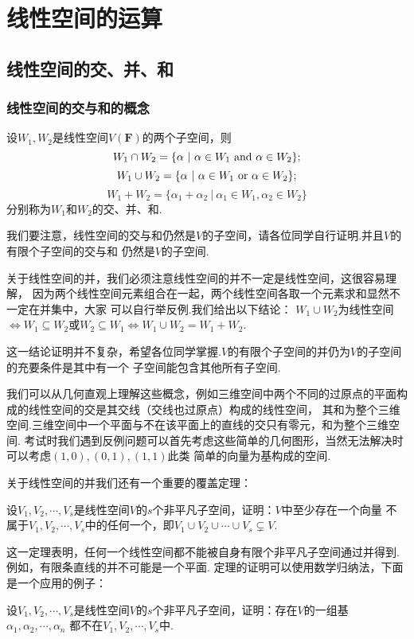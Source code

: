\chapter{线性空间的运算}

\section{线性空间的交、并、和}
\subsection{线性空间的交与和的概念}
\begin{definition}
	设$W_1,W_2$是线性空间$V(\mathbf{F})$的两个子空间，则
	$$W_1 \cap W_2=\{\alpha\ |\ \alpha\in W_1 \textup{ and } \alpha\in W_2\};$$
	$$W_1 \cup W_2=\{\alpha\ |\ \alpha\in W_1 \textup{ or } \alpha\in W_2\};$$
	$$W_1 + W_2=\{\alpha_1+\alpha_2\ |\ \alpha_1\in W_1,\alpha_2\in W_2\}$$
	分别称为$W_1$和$W_2$的交、并、和.
\end{definition}
我们要注意，线性空间的交与和仍然是$V$的子空间，请各位同学自行证明.并且$V$的有限个子空间的交与和
仍然是$V$的子空间.

关于线性空间的并，我们必须注意线性空间的并不一定是线性空间，这很容易理解，
因为两个线性空间元素组合在一起，两个线性空间各取一个元素求和显然不一定在并集中，大家
可以自行举反例.我们给出以下结论：
$W_1 \cup W_2$为线性空间$\iff W_1 \subseteq W_2$或$W_2 \subseteq W_1 \iff W_1 \cup W_2=W_1+W_2.$

这一结论证明并不复杂，希望各位同学掌握.$V$的有限个子空间的并仍为$V$的子空间的充要条件是其中有一个
子空间能包含其他所有子空间.

我们可以从几何直观上理解这些概念，例如三维空间中两个不同的过原点的平面构成的线性空间的交是其交线（交线也过原点）构成的线性空间，
其和为整个三维空间.三维空间中一个平面与不在该平面上的直线的交只有零元，和为整个三维空间.
考试时我们遇到反例问题可以首先考虑这些简单的几何图形，当然无法解决时可以考虑$(1,0),(0,1),(1,1)$此类
简单的向量为基构成的空间.

关于线性空间的并我们还有一个重要的覆盖定理：
\begin{theorem}
	设$V_1,V_2,\cdots,V_s$是线性空间$V$的$s$个非平凡子空间，证明：$V$中至少存在一个向量
	不属于$V_1,V_2,\cdots,V_s$中的任何一个，即$V_1 \cup V_2 \cup \cdots \cup V_s\subsetneq V.$
\end{theorem}
这一定理表明，任何一个线性空间都不能被自身有限个非平凡子空间通过并得到.例如，有限条直线的并不可能是一个平面.
定理的证明可以使用数学归纳法，下面是一个应用的例子：
\begin{example}
	设$V_1,V_2,\cdots,V_s$是线性空间$V$的$s$个非平凡子空间，证明：存在$V$的一组基$\alpha_1,\alpha_2,\cdots,\alpha_n$
	都不在$V_1,V_2,\cdots,V_s$中.
\end{example}

